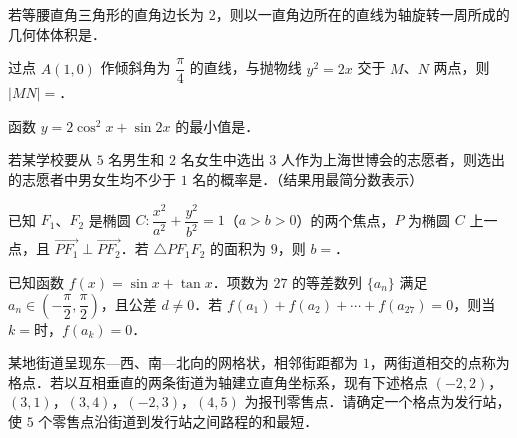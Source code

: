 \begin{question}
若等腰直角三角形的直角边长为 $2$，则以一直角边所在的直线为轴旋转一周所成的几何体体积是\gkblank{}．

\end{question}
\begin{question}
过点 $A(1,0)$ 作倾斜角为 $\dfrac{\pi}{4}$ 的直线，与抛物线 $y^2=2x$ 交于 $M$、$N$ 两点，则 $|MN|=$\gkblank{}．

\end{question}
\begin{question}
函数 $y=2\cos^2x+\sin2x$ 的最小值是\gkblank{}．

\end{question}
\begin{question}
若某学校要从 $5$ 名男生和 $2$ 名女生中选出 $3$ 人作为上海世博会的志愿者，则选出的志愿者中男女生均不少于 $1$ 名的概率是\gkblank{}．（结果用最简分数表示）

\end{question}
\begin{question}
已知 $F_1$、$F_2$ 是椭圆 $C:\dfrac{x^2}{a^2}+\dfrac{y^2}{b^2}=1$（$a>b>0$）的两个焦点，$P$ 为椭圆 $C$ 上一点，且 $\overrightarrow{PF_1}\perp\overrightarrow{PF_2}$．若 $\triangle PF_1F_2$ 的面积为 $9$，则 $b=$\gkblank{}．

\end{question}
\begin{question}
已知函数 $f(x)=\sin x+\tan x$．项数为 $27$ 的等差数列 $\{a_n\}$ 满足 $a_n\in\left(-\dfrac{\pi}{2},\dfrac{\pi}{2}\right)$，且公差 $d\neq0$．若 $f(a_1)+f(a_2)+\cdots+f(a_{27})=0$，则当 $k=$\gkblank{}时，$f(a_k)=0$．

\end{question}
\begin{question}
某地街道呈现东—西、南—北向的网格状，相邻街距都为 $1$，两街道相交的点称为格点．若以互相垂直的两条街道为轴建立直角坐标系，现有下述格点 $(-2,2)$，$(3,1)$，$(3,4)$，$(-2,3)$，$(4,5)$ 为报刊零售点．请确定一个格点\gkblank{}为发行站，使 $5$ 个零售点沿街道到发行站之间路程的和最短．

\end{question}

